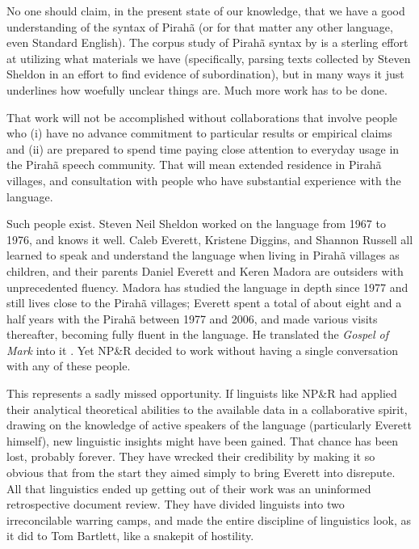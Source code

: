 \documentclass[output=paper,colorlinks,citecolor=brown
]{langscibook}
\begin{document}
No one should claim, in the present state of our knowledge, that we
have a good understanding of the syntax of Pirah{\~a} (or for that
matter any other language, even Standard English). The corpus study
of Pirah{\~a} syntax by \citet{FutrellEtAl16} is a sterling effort
at utilizing what materials we have (specifically, parsing texts
collected by Steven Sheldon in an effort to find evidence of
subordination), but in many ways it just underlines how woefully
unclear things are. Much more work has to be done.

That work will not be accomplished without collaborations that involve
people who (i) have no advance commitment to particular results or
empirical claims and (ii) are prepared to spend time paying close
attention to everyday usage in the Pirah{\~a} speech community. That
will mean extended residence in Pirah{\~a} villages, and consultation
with people who have substantial experience with the language.

Such people exist. Steven Neil Sheldon worked on the language from
1967 to 1976, and knows it well. Caleb Everett, Kristene Diggins,
and Shannon Russell all learned to speak and understand the language
when living in Pirah{\~a} villages as children, and their parents
Daniel Everett and Keren Madora are outsiders with unprecedented
fluency. Madora has studied the language in depth since 1977 and
still lives close to the Pirah{\~a} villages; Everett spent a total
of about eight and a half years with the Pirah{\~a} between 1977
and 2006, and made various visits thereafter, becoming fully fluent
in the language. He translated the \textit{Gospel of Mark} into it
\citep{Everett86Mark}. Yet NP\&R decided to work without having a
single conversation with any of these people.

This represents a sadly missed opportunity. If linguists like NP\&R
had applied their analytical theoretical abilities to the available
data in a collaborative spirit, drawing on the knowledge of active
speakers of the language (particularly Everett himself), new linguistic
insights might have been gained. That chance has been lost, probably
forever. They have wrecked their credibility by making it so obvious
that from the start they aimed simply to bring Everett into disrepute.
All that linguistics ended up getting out of their work was an
uninformed retrospective document review. They have divided linguists
into two irreconcilable warring camps, and made the entire discipline
of linguistics look, as it did to Tom Bartlett, like a snakepit of
hostility.
\end{document}
